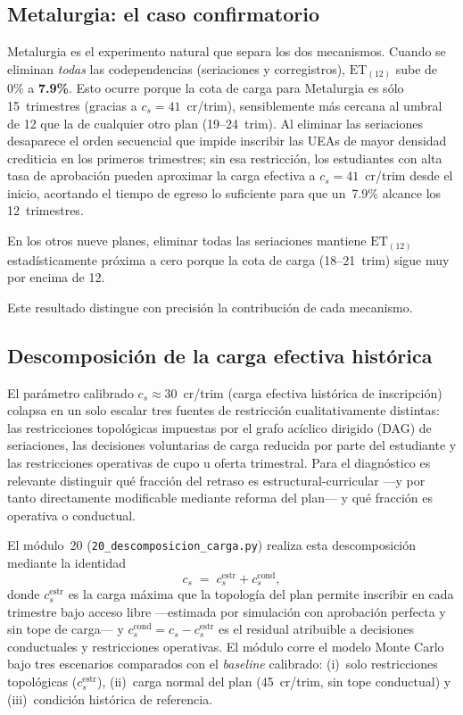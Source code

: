 \documentclass[11pt,letterpaper]{article}
\newcommand{\ET}[1]{\mathrm{ET}_{(#1)}}
\begin{document}
\subsection{Metalurgia: el caso confirmatorio}

Metalurgia es el experimento natural que separa los dos mecanismos.
Cuando se eliminan \emph{todas} las codependencias (seriaciones y
corregistros), $\ET{12}$ sube de 0\% a \textbf{7.9\%}.
Esto ocurre porque la cota de carga para Metalurgia es sólo 15~trimestres
(gracias a $c_s=41$~cr/trim), sensiblemente más cercana al umbral de 12 que
la de cualquier otro plan (19--24~trim).
Al eliminar las seriaciones desaparece el orden secuencial que impide
inscribir las UEAs de mayor densidad crediticia en los primeros trimestres;
sin esa restricción, los estudiantes con alta tasa de aprobación pueden
aproximar la carga efectiva a $c_s=41$~cr/trim desde el inicio, acortando
el tiempo de egreso lo suficiente para que un~7.9\% alcance los 12~trimestres.

En los otros nueve planes, eliminar todas las seriaciones mantiene $\ET{12}$
estadísticamente próxima a cero
porque la cota de carga (18--21~trim) sigue muy por encima de 12.

Este resultado distingue con precisión la contribución de cada mecanismo.

\subsection{Descomposición de la carga efectiva histórica}
\label{sec:descomposicion_carga}

El parámetro calibrado $c_s \approx 30$~cr/trim (carga efectiva histórica de
inscripción) colapsa en un solo escalar tres fuentes de restricción cualitativamente
distintas: las restricciones topológicas impuestas por el grafo acíclico dirigido
(DAG) de seriaciones, las decisiones voluntarias de carga reducida por parte del
estudiante y las restricciones operativas de cupo u oferta trimestral.
Para el diagnóstico es relevante distinguir qué fracción del retraso es
estructural-curricular ---y por tanto directamente modificable mediante reforma del
plan--- y qué fracción es operativa o conductual.

El módulo~20 (\texttt{20\_descomposicion\_carga.py}) realiza esta descomposición
mediante la identidad
\begin{equation}
  c_s \;=\; c_s^{\mathrm{estr}} + c_s^{\mathrm{cond}},
  \label{eq:descomposicion_cs}
\end{equation}
donde $c_s^{\mathrm{estr}}$ es la carga máxima que la topología del plan permite
inscribir en cada trimestre bajo acceso libre ---estimada por simulación con
aprobación perfecta y sin tope de carga--- y $c_s^{\mathrm{cond}} = c_s - c_s^{\mathrm{estr}}$
es el residual atribuible a decisiones conductuales y restricciones operativas.
El módulo corre el modelo Monte Carlo bajo tres escenarios comparados con el
\emph{baseline} calibrado: (i)~solo restricciones topológicas ($c_s^{\mathrm{estr}}$),
(ii)~carga normal del plan (45~cr/trim, sin tope conductual) y (iii)~condición
histórica de referencia.
\end{document}
